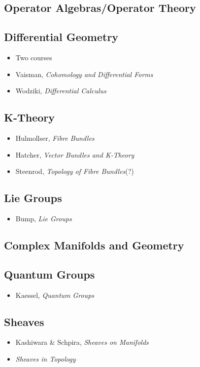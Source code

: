 \documentclass[12pt]{article}
\begin{document}
\subsection{Operator Algebras/Operator Theory}

\subsection{Differential Geometry}
\begin{itemize}
  \item Two courses
  \item Vaisman, \textit{Cohomology and Differential Forms}
  \item Wodziki, \textit{Differential Calculus}
\end{itemize}

\subsection{K-Theory}
\begin{itemize}
  \item Hulmollser, \textit{Fibre Bundles}
  \item Hatcher, \textit{Vector Bundles and K-Theory}
  \item Steenrod, \textit{Topology of Fibre Bundles}(?)
\end{itemize}

\subsection{Lie Groups}
\begin{itemize}
  \item Bump, \textit{Lie Groups}
\end{itemize}

\subsection{Complex Manifolds and Geometry}

\subsection{Quantum Groups}
\begin{itemize}
  \item Kaessel, \textit{Quantum Groups}
\end{itemize}

\subsection{Sheaves}
\begin{itemize}
  \item Kashiwara \& Schpira, \textit{Sheaves on Manifolds}
  \item \textit{Sheaves in Topology}
\end{itemize}
\end{document}
